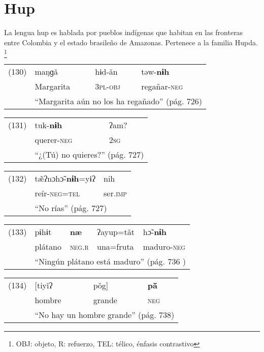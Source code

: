 \section*{Hup}

\noindent La lengua hup es hablada por pueblos indígenas que habitan en las fronteras entre Colombia y el estado brasileño de Amazonas. Pertenece a la familia Hupda.
\footnote{OBJ: objeto, R: refuerzo, TEL: télico, énfasis contrastivo}
\vspace{0.5cm}

{\setmainfont{Charis SIL} 

\begin{tabular}{llll}
(130) & maŋɡǎ & hɨd-ǎn & təw-\textbf{nɨh} \\
& Margarita & \textsc{3pl-obj} & regañar-\textsc{neg} \\
& \multicolumn{3}{l}{``Margarita aún no los ha regañado'' (pág. 726)}
\end{tabular} \vspace{0.5cm}

\begin{tabular}{lll}
(131) & tuk-\textbf{nɨh} & ʔam? \\
& querer-\textsc{neg} & \textsc{2sg} \\
& \multicolumn{2}{l}{``¿(Tú) no quieres?'' (pág. 727)}
\end{tabular} \vspace{0.5cm}

\begin{tabular}{lll}
(132) & tæ̃ʔnɔhɔ̃-\textbf{nɨh}=yɨʔ & nih \\
& reír-\textsc{neg=tel} & ser.\textsc{imp} \\
& \multicolumn{2}{l}{``No rías'' (pág. 727)}
\end{tabular} \vspace{0.5cm}

\begin{tabular}{lllll}
(133) & pɨhɨt & \textbf{næ} & ʔayup=tǎt & hɔ̃-\textbf{nɨh} \\
& plátano & \textsc{neg.r} & una=fruta & maduro-\textsc{neg} \\
& \multicolumn{4}{l}{``Ningún plátano está maduro'' (pág. 736 )}
\end{tabular} \vspace{0.5cm}

\begin{tabular}{llll}
(134) & [tiyǐʔ & pǒg] & \textbf{pā̌} \\
& hombre & grande & \textsc{neg} \\
& \multicolumn{3}{l}{``No hay un hombre grande'' (pág. 738)}
\end{tabular} \vspace{0.5cm}

}

